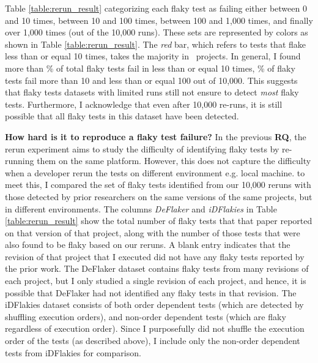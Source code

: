 Table \ref{table:rerun_result} categorizing each flaky test as failing either between 0 and 10 times, between 10 and 100 times, between 100 and 1,000 times, and finally over 1,000 times (out of the 10,000 runs).
These sets are represented by colors as shown in Table \ref{table:rerun_result}. The \emph{red} bar, which refers to tests that flake less than or equal 10 times, takes the majority in \redbarsratio~projects. 
In general, I found more than \NumFailingRunsTen\% of total flaky tests fail in less than or equal 10 times, \NumFailingRunsHundred\% of flaky tests fail more than 10 and less than or equal 100 out of 10,000.
This suggests that flaky tests datasets with limited runs still not ensure to detect \emph{most} flaky tests.
Furthermore, I acknowledge that even after 10,000 re-runs, it is still possible that all flaky tests in this dataset have been detected. 

\textbf{How hard is it to reproduce a flaky test failure?}
In the previous \textbf{RQ}, the rerun experiment aims to study the difficulty of identifying flaky tests by re-running them on the same platform. However, this does not capture the difficulty when a developer rerun the tests on different environment e.g. local machine. to meet this, I compared the set of flaky tests identified from our 10,000 reruns with those detected by prior researchers on the same versions of the same projects, but in different environments.
The columns \emph{DeFlaker} and \emph{iDFlakies} in Table \ref{table:rerun_result} show the total number of flaky tests that that paper reported on that version of that project, along with the number of those tests that were also found to be flaky based on our reruns.
A blank entry indicates that the revision of that project that I executed did not have any flaky tests reported by the prior work.
The DeFlaker dataset contains flaky tests from many revisions of each project, but I only studied a single revision of each project, and hence, it is possible that DeFlaker had not identified any flaky tests in that revision.
The iDFlakies dataset consists of both order dependent tests (which are detected by shuffling execution orders), and non-order dependent tests (which are flaky regardless of execution order).
Since I purposefully did not shuffle the execution order of the tests (as described above), I include only the non-order dependent tests from iDFlakies for comparison. 

